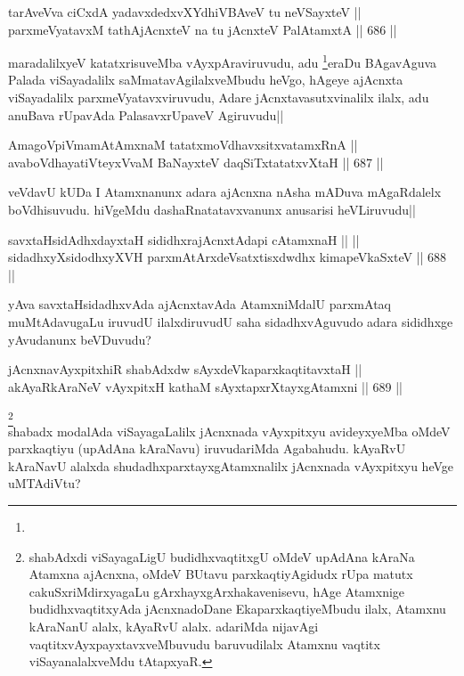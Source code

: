 \begin{shl}
tarAveVva ciCxdA yadavxdedxvXYdhiVBAveV tu neVSayxteV || \\
parxmeVyatavxM tathA\s jAcnxteV na tu jAcnxteV PalAtamxtA ||  686 ||  
\end{shl}

\begin{artha} 
maradalilxyeV katatxrisuveMba vAyxpAraviruvudu, adu 
\footnote[2]{}eraDu BAgavAguva Palada viSayadalilx 
saMmatavAgilalxveMbudu heVgo, hAgeye ajAcnxta viSayadalilx 
parxmeVyatavxviruvudu, Adare jAcnxtavasutxvinalilx ilalx, adu anuBava 
rUpavAda PalasavxrUpaveV Agiruvudu||
\end{artha}

\begin{shl}
AmagoV\s piVmamAtAmxnaM tatatxmoVdhavxsitxvatamxRnA || \\
avaboVdhayatiVteyxVvaM BaNayxteV daqSiTxtatatxvXtaH ||  687 ||  
\end{shl}

\begin{artha} 
veVdavU kUDa I Atamxnanunx adara ajAcnxna nAsha mADuva mAgaRdalelx 
boVdhisuvudu. hiVgeMdu dashaRnatatavxvanunx anusarisi heVLiruvudu||
\end{artha}

\begin{shl}
savxtaHsidAdhxdayxtaH sididhxrajAcnxtAdapi cA\s \s tamxnaH ||  || \\
sidadhxyXsidodhxyXVH parxmAtArxdeVsatxtisxdwdhx kimapeVkaSxteV ||  688 ||  
\end{shl}

\begin{artha} 
yAva savxtaHsidadhxvAda ajAcnxtavAda AtamxniMdalU parxmAtaq 
muMtAdavugaLu iruvudU ilalxdiruvudU saha sidadhxvAguvudo adara 
sididhxge yAvudanunx beVDuvudu?  
\end{artha}


\begin{shl}
jAcnxnavAyxpitxhiR shabAdxdw sAyxdeVkaparxkaqtitavxtaH || \\
akAyaRkAraNeV vAyxpitxH kathaM sAyxtapxrXtayxgAtamxni ||  689 ||  
\end{shl}

\begin{artha} 
\footnote[1]{shabAdxdi viSayagaLigU budidhxvaqtitxgU oMdeV upAdAna 
kAraNa Atamxna ajAcnxna, oMdeV BUtavu parxkaqtiyAgidudx rUpa matutx 
cakuSxriMdirxyagaLu gArxhayxgArxhakavenisevu, hAge Atamxnige 
budidhxvaqtitxyAda jAcnxnadoDane EkaparxkaqtiyeMbudu ilalx, Atamxnu 
kAraNanU alalx, kAyaRvU alalx. adariMda nijavAgi 
vaqtitxvAyxpayxtavxveMbuvudu baruvudilalx Atamxnu vaqtitx 
viSayanalalxveMdu tAtapxyaR.}\\
shabadx modalAda viSayagaLalilx jAcnxnada vAyxpitxyu avideyxyeMba 
oMdeV parxkaqtiyu (upAdAna kAraNavu) iruvudariMda Agabahudu. kAyaRvU 
kAraNavU alalxda shudadhxparxtayxgAtamxnalilx jAcnxnada vAyxpitxyu 
heVge uMTAdiVtu?
\end{artha}

